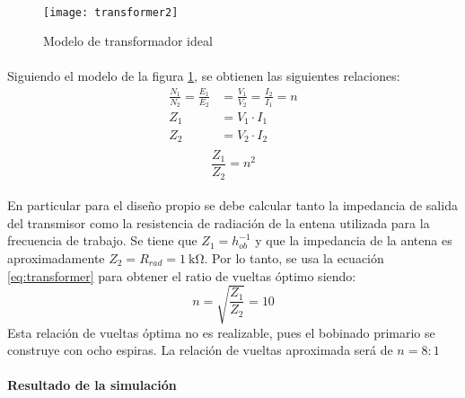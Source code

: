 \paragraph{}
\begin{figure}[h!]
    \centering
    \texttt{[image: transformer2]}
    \caption{Modelo de transformador ideal}
    \label{fig:transformer}
\end{figure}
\paragraph{}
Siguiendo el modelo de la figura \ref{fig:transformer}, se obtienen las siguientes relaciones:
\begin{align*}
   \frac{N_1}{N_2} = \frac{E_1}{E_2} &= \frac{V_1}{V_2} = \frac{I_2}{I_1} = n \\
   Z_1 &= V_1 \cdot I_1 \\
   Z_2 &= V_2 \cdot I_2 \\
\end{align*}
\begin{equation}
   \label{eq:transformer}
   \frac{Z_1}{Z_2} = n^2 
\end{equation}
\paragraph{}
En particular para el diseño propio se debe calcular tanto la impedancia de salida del transmisor como la resistencia de radiación de la entena utilizada para la frecuencia de trabajo.
Se tiene que $Z_1 = h_{ob}^{-1}$ y que la impedancia de la antena es aproximadamente $Z_2 = R_{rad} = \SI{1}{\kilo\ohm}$.
Por lo tanto, se usa la ecuaci\'on \ref{eq:transformer} para obtener el ratio de vueltas óptimo siendo: $$ n = \sqrt{\frac{Z_1}{Z_2}} = 10 $$
Esta relación de vueltas óptima no es realizable, pues el bobinado primario se construye con ocho espiras. La relación de vueltas aproximada será de $ n = 8:1 $


\paragraph{Resultado de la simulaci\'on} %
